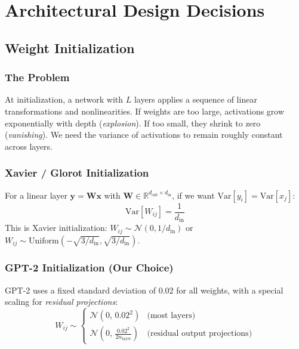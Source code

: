 \documentclass[11pt, a4paper]{article}
\theoremstyle{definition}
\newcommand{\vx}{\bm{x}}
\newcommand{\vy}{\bm{y}}
\newcommand{\mW}{\bm{W}}
\newcommand{\reals}{\mathbb{R}}
\newcommand{\Var}{\mathrm{Var}}
\newcommand{\nlayer}{n_{\text{layer}}}
\begin{document}
\section{Architectural Design Decisions}

\subsection{Weight Initialization}

\subsubsection{The Problem}

At initialization, a network with $L$ layers applies a sequence of linear transformations and nonlinearities. If weights are too large, activations grow exponentially with depth (\emph{explosion}). If too small, they shrink to zero (\emph{vanishing}). We need the variance of activations to remain roughly constant across layers.

\subsubsection{Xavier / Glorot Initialization}

For a linear layer $\vy = \mW \vx$ with $\mW \in \reals^{d_{\text{out}} \times d_{\text{in}}}$, if we want $\Var[y_i] = \Var[x_j]$:
\begin{equation}
    \Var[W_{ij}] = \frac{1}{d_{\text{in}}}
\end{equation}
This is Xavier initialization: $W_{ij} \sim \mathcal{N}(0, 1/d_{\text{in}})$ or $W_{ij} \sim \mathrm{Uniform}(-\sqrt{3/d_{\text{in}}}, \sqrt{3/d_{\text{in}}})$.

\subsubsection{GPT-2 Initialization (Our Choice)}

GPT-2 uses a fixed standard deviation of $0.02$ for all weights, with a special scaling for \emph{residual projections}:
\begin{equation}\label{eq:gpt2_init}
    W_{ij} \sim \begin{cases}
        \mathcal{N}(0, \, 0.02^2) & \text{(most layers)} \\
        \mathcal{N}\left(0, \, \frac{0.02^2}{2\nlayer}\right) & \text{(residual output projections)}
    \end{cases}
\end{equation}
\end{document}
